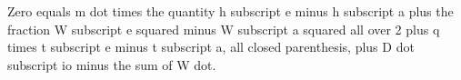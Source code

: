 Zero equals m dot times the quantity h subscript e minus h subscript a plus the fraction W subscript e squared minus W subscript a squared all over 2 plus q times t subscript e minus t subscript a, all closed parenthesis, plus D dot subscript io minus the sum of W dot.
